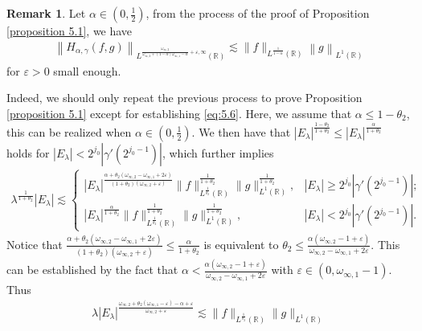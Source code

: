 \documentclass[11pt, twoside, leqno]{article}
\theoremstyle{definition}
\newtheorem{remark}[theorem]{Remark}
\numberwithin{equation}{section}
\begin{document}
\begin{remark}\label{remark 5.2}
Let $\alpha\in(0, \frac{1}{2})$, from the process of the proof of Proposition \ref{proposition 5.1}, we have
\begin{align}\label{eq:5.7}
\left\|H_{\alpha,\gamma}(f,g)\right\|_{L^{\frac{\omega_{\infty,2}}{\omega_{\infty,2}+ (1-\alpha)\omega_{\infty,1}-\alpha}+\varepsilon, \infty}(\mathbb{R})}\lesssim \|f\|_{L^{\frac{1}{1-\alpha}}(\mathbb{R})}\left\|g\right\|_{L^{1}(\mathbb{R})}
\end{align}
for $\varepsilon>0$ small enough.

Indeed, we should only repeat the previous process to prove Proposition \ref{proposition 5.1} except for establishing \eqref{eq:5.6}. Here, we assume that $\alpha\leq1-\theta_2$, this can be realized when $\alpha\in(0, \frac{1}{2})$. We then have that
$|E_\lambda|^{\frac{1-\theta_{2}}{1+\theta_{2}}}\leq |E_\lambda|^{\frac{\alpha}{1+\theta_{2}}}$ holds for $|E_{\lambda}|<2^{j_0}|\gamma'(2^{j_{0}-1})|$, which further implies
\begin{align*}
\lambda^{\frac{1}{1+\theta_2}}|E_{\lambda}|\lesssim
\begin{cases}
   |E_\lambda|^{\frac{\alpha+\theta_{2}(\omega_{\infty,2}-\omega_{\infty,1}+2\varepsilon)}{(1+\theta_{2})(\omega_{\infty,2}+\varepsilon)}}\|f\|^{\frac{1}{1+\theta_2}}_{L^{\frac{1}{\theta_2}}(\mathbb{R})}\|g\|^{\frac{1}{1+\theta_2}}_{L^{1}(\mathbb{R})}, & |E_\lambda|\geq2^{j_0}|\gamma'(2^{j_{0}-1})|; \\
  |E_\lambda|^{\frac{\alpha}{1+\theta_{2}}}
\|f\|^{\frac{1}{1+\theta_2}}_{L^{\frac{1}{\theta_2}}(\mathbb{R})}\|g\|^{\frac{1}{1+\theta_2}}_{L^{1}(\mathbb{R})}, &|E_{\lambda}|<2^{j_0}|\gamma'(2^{j_{0}-1})|.
\end{cases}
 \end{align*}
Notice that $\frac{\alpha+\theta_{2}(\omega_{\infty,2}-\omega_{\infty,1}+2\varepsilon)}{(1+\theta_{2})(\omega_{\infty,2}+\varepsilon)}\leq\frac{\alpha}{1+\theta_{2}}$ is equivalent to $\theta_2\leq\frac{\alpha(\omega_{\infty,2}-1+\varepsilon)}{\omega_{\infty,2}-\omega_{\infty,1}+2\varepsilon}$. This can be established by the fact that $\alpha<\frac{\alpha(\omega_{\infty,2}-1+\varepsilon)}{\omega_{\infty,2}-\omega_{\infty,1}+2\varepsilon} $ with $\varepsilon\in(0, \omega_{\infty,1}-1)$. Thus
\begin{align*}
\lambda|E_{\lambda}|^{\frac{\omega_{\infty,2}+ \theta_2(\omega_{\infty,1}-\varepsilon)-\alpha+\varepsilon}{\omega_{\infty,2}+\varepsilon}}\lesssim \|f\|_{L^{\frac{1}{\theta_2}}(\mathbb{R})}\|g\|_{L^{1}(\mathbb{R})}

\end{align*}
\end{remark}
\end{document}
